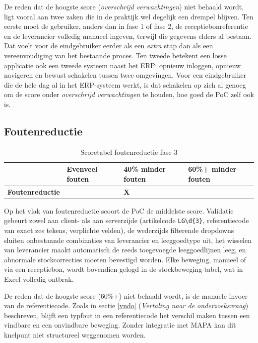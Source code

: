 De reden dat de hoogste score (\textit{overschrijd verwachtingen}) niet behaald wordt, ligt vooral aan twee zaken die in de praktijk wel degelijk een drempel blijven. Ten eerste moet de gebruiker, anders dan in fase 1 of fase 2, de receptiebonreferentie en de leverancier volledig manueel ingeven, terwijl die gegevens elders al bestaan. Dat voelt voor de eindgebruiker eerder als een \emph{extra} stap dan als een vereenvoudiging van het bestaande proces. Ten tweede betekent een losse applicatie ook een tweede systeem naast het ERP: opnieuw inloggen, opnieuw navigeren en bewust schakelen tussen twee omgevingen. Voor een eindgebruiker die de hele dag al in het ERP-systeem werkt, is dat schakelen op zich al genoeg om de score onder \emph{overschrijd verwachtingen} te houden, hoe goed de PoC zelf ook is.

\subsection{Foutenreductie}

\begin{table}[H]
    \centering
    \begin{tabular}{|p{4cm}|p{3cm}|p{3cm}|p{3cm}|}
        \hline
        & \textbf{Evenveel fouten} & \textbf{40\% minder fouten} & \textbf{60\%+ minder fouten} \\
        \hline
        \textbf{Foutenreductie} &  & \textbf{X} &  \\
        \hline
    \end{tabular}
    \caption[Scoretabel foutenreductie fase 3]{\label{tab:tbf_f3}Scoretabel foutenreductie fase 3}
\end{table}

Op het vlak van foutenreductie scoort de PoC de middelste score. Validatie gebeurt zowel aan client- als aan serverzijde (artikelcode \texttt{LG\textbackslash d\{3\}}, referentiecode van exact zes tekens, verplichte velden), de wederzijds filterende dropdowns sluiten onbestaande combinaties van leverancier en leeggoedtype uit, het wisselen van leverancier maakt automatisch de reeds toegevoegde leeggoedlijnen leeg, en abnormale stockcorrecties moeten bevestigd worden. Elke beweging, manueel of via een receptiebon, wordt bovendien gelogd in de stockbeweging-tabel, wat in Excel volledig ontbrak.

De reden dat de hoogste score (60\%+) niet behaald wordt, is de manuele invoer van de referentiecode. Zoals in sectie \ref{vndo} (\textit{Vertaling naar de onderzoeksvraag}) beschreven, blijft een typfout in een referentiecode het verschil maken tussen een vindbare en een onvindbare beweging. Zonder integratie met MAPA kan dit knelpunt niet structureel weggenomen worden.

